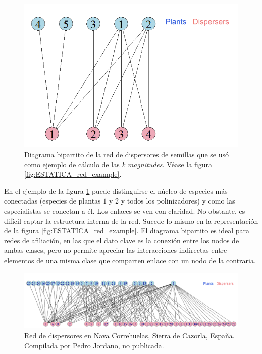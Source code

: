 \begin{figure}[h!]
\centering
\includegraphics[scale=0.35]{Figures/VIS_SD_030_bipartita.png}
\caption{Diagrama bipartito de la red de dispersores de semillas que se usó como ejemplo de cálculo de las \textit{k magnitudes}. Véase la figura \ref{fig:ESTATICA_red_example}.}
\label{fig:Figures/VIS_SD_030_bipartita}
\end{figure}

En el ejemplo de la figura \ref{fig:Figures/VIS_SD_030_bipartita} puede distinguirse el núcleo de especies más conectadas (especies de plantas $1$ y $2$ y todos los polinizadores) y como las especialistas se conectan a él. Los enlaces se ven con claridad. No obstante, es difícil captar la estructura interna de la red. Sucede lo mismo en la representación de la figura \ref{fig:ESTATICA_red_example}. El diagrama bipartito es ideal para redes de afiliación, en las que el dato clave es la conexión entre los nodos de ambas clases, pero no permite apreciar las interacciones indirectas entre elementos de una misma clase que comparten enlace con un nodo de la contraria.

\begin{figure}[h!]
\centering
\includegraphics[scale=0.4]{Figures/VIS_bipartito_SD_020.png}
\caption{Red de dispersores en Nava Correhuelas, Sierra de Cazorla, España. Compilada por Pedro Jordano, no publicada.}
\label{fig:VIS_bipartito_SD_020}
\end{figure}

